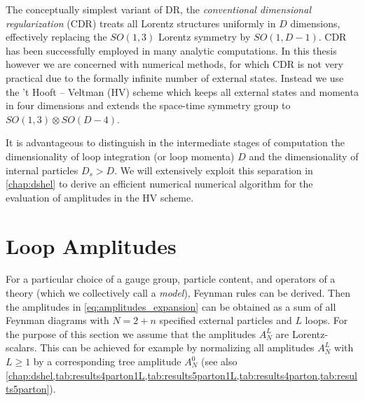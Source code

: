 The conceptually simplest variant of DR, the \emph{conventional dimensional regularization} (CDR)
treats all Lorentz structures uniformly in $D$ dimensions, effectively replacing the $SO(1,3)$ Lorentz symmetry by $SO(1,D-1)$.
CDR has been successfully employed in many analytic computations.
In this thesis however we are concerned with numerical methods, for which CDR is not very practical due to the
formally infinite number of external states.
Instead we use the 't Hooft -- Veltman (HV) scheme which keeps all external states and momenta in four dimensions and
extends the space-time symmetry group to $SO(1,3)\otimes SO(D-4)$.

It is advantageous to distinguish in the intermediate stages of computation the dimensionality of loop integration (or loop momenta) $D$ and
the dimensionality of internal particles $D_s > D$.
We will extensively exploit this separation in \cref{chap:dshel} to derive an efficient numerical numerical algorithm
for the evaluation of amplitudes in the HV scheme.


\section{Loop Amplitudes}

For a particular choice of a gauge group, particle content, and operators of
a theory (which we collectively call a \emph{model}), Feynman rules can be derived.
Then the amplitudes in \cref{eq:amplitudes_expansion} can be obtained as a sum of all Feynman diagrams
with $N = 2+n$ specified external particles and $L$ loops.
For the purpose of this section we assume that the amplitudes $A^{L}_N$ are Lorentz-scalars.
This can be achieved for example by normalizing all amplitudes $A^{L}_N$ with $L\geq1$ by
a corresponding tree amplitude $A^{0}_N$ 
(see also \cref{chap:dshel,tab:results4parton1L,tab:results5parton1L,tab:results4parton,tab:results5parton}).


